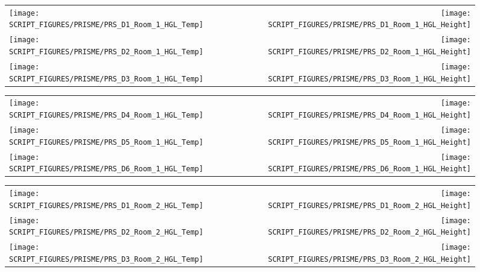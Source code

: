 \begin{figure}[!ht]
\begin{tabular*}{\textwidth}{l@{\extracolsep{\fill}}r}
\texttt{[image: SCRIPT\_FIGURES/PRISME/PRS\_D1\_Room\_1\_HGL\_Temp]} &
\texttt{[image: SCRIPT\_FIGURES/PRISME/PRS\_D1\_Room\_1\_HGL\_Height]} \\
\texttt{[image: SCRIPT\_FIGURES/PRISME/PRS\_D2\_Room\_1\_HGL\_Temp]} &
\texttt{[image: SCRIPT\_FIGURES/PRISME/PRS\_D2\_Room\_1\_HGL\_Height]} \\
\texttt{[image: SCRIPT\_FIGURES/PRISME/PRS\_D3\_Room\_1\_HGL\_Temp]} &
\texttt{[image: SCRIPT\_FIGURES/PRISME/PRS\_D3\_Room\_1\_HGL\_Height]}
\end{tabular*}
\label{PRISME_HGL_1}
\end{figure}

\begin{figure}[p]
\begin{tabular*}{\textwidth}{l@{\extracolsep{\fill}}r}
\texttt{[image: SCRIPT\_FIGURES/PRISME/PRS\_D4\_Room\_1\_HGL\_Temp]} &
\texttt{[image: SCRIPT\_FIGURES/PRISME/PRS\_D4\_Room\_1\_HGL\_Height]} \\
\texttt{[image: SCRIPT\_FIGURES/PRISME/PRS\_D5\_Room\_1\_HGL\_Temp]} &
\texttt{[image: SCRIPT\_FIGURES/PRISME/PRS\_D5\_Room\_1\_HGL\_Height]} \\
\texttt{[image: SCRIPT\_FIGURES/PRISME/PRS\_D6\_Room\_1\_HGL\_Temp]} &
\texttt{[image: SCRIPT\_FIGURES/PRISME/PRS\_D6\_Room\_1\_HGL\_Height]}
\end{tabular*}
\label{PRISME_HGL_2}
\end{figure}

\begin{figure}[p]
\begin{tabular*}{\textwidth}{l@{\extracolsep{\fill}}r}
\texttt{[image: SCRIPT\_FIGURES/PRISME/PRS\_D1\_Room\_2\_HGL\_Temp]} &
\texttt{[image: SCRIPT\_FIGURES/PRISME/PRS\_D1\_Room\_2\_HGL\_Height]} \\
\texttt{[image: SCRIPT\_FIGURES/PRISME/PRS\_D2\_Room\_2\_HGL\_Temp]} &
\texttt{[image: SCRIPT\_FIGURES/PRISME/PRS\_D2\_Room\_2\_HGL\_Height]} \\
\texttt{[image: SCRIPT\_FIGURES/PRISME/PRS\_D3\_Room\_2\_HGL\_Temp]} &
\texttt{[image: SCRIPT\_FIGURES/PRISME/PRS\_D3\_Room\_2\_HGL\_Height]}
\end{tabular*}
\label{PRISME_HGL_3}
\end{figure}

